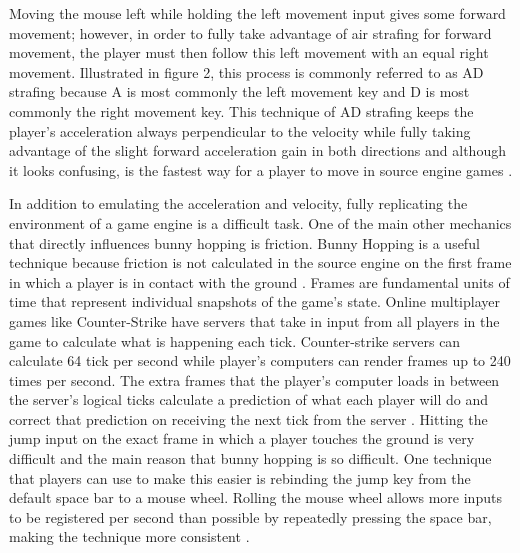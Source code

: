 \documentclass[10pt,twocolumn]{article}
\begin{document}
Moving the mouse left while holding the left movement input gives some forward movement; however, in order to fully take advantage of air strafing for forward movement, the player must then follow this left movement with an equal right movement. Illustrated in figure 2, this process is commonly referred to as AD strafing because A is most commonly the left movement key and D is most commonly the right movement key. This technique of AD strafing keeps the player's acceleration always perpendicular to the velocity while fully taking advantage of the slight forward acceleration gain in both directions and although it looks confusing, is the fastest way for a player to move in source engine games \cite{AirStrafingExplained}.

In addition to emulating the acceleration and velocity, fully replicating the environment of a game engine is a difficult task. One of the main other mechanics that directly influences bunny hopping is friction. Bunny Hopping is a useful technique because friction is not calculated in the source engine on the first frame in which a player is in contact with the ground \cite{BunnyHoppingProgrammers}. Frames are fundamental units of time that represent individual snapshots of the game's state. Online multiplayer games like Counter-Strike have servers that take in input from all players in the game to calculate what is happening each tick. Counter-strike servers can calculate 64 tick per second while player's computers can render frames up to 240 times per second. The extra frames that the player's computer loads in between the server's logical ticks calculate a prediction of what each player will do and correct that prediction on receiving the next tick from the server \cite{MoreSteamAirstrafe}. Hitting the jump input on the exact frame in which a player touches the ground is very difficult and the main reason that bunny hopping is so difficult. One technique that players can use to make this easier is rebinding the jump key from the default space bar to a mouse wheel. Rolling the mouse wheel allows more inputs to be registered per second than possible by repeatedly pressing the space bar, making the technique more consistent \cite{BhopTutorialValorant}.
\end{document}
